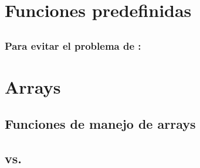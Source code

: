 \documentclass[a4paper,11pt,spanish]{sphinxmanual}
\begin{document}
\section{Funciones predefinidas}
\label{\detokenize{php:funciones-predefinidas}}

\subsection{}
\label{\detokenize{php:isset}}

\subsection{}
\label{\detokenize{php:empty}}

\subsubsection{Para evitar el problema de :}
\label{\detokenize{php:para-evitar-el-problema-de-empty-0-true}}
\begin{sphinxVerbatim}[commandchars=\\\{\}]
 
       
\end{sphinxVerbatim}


\section{Arrays}
\label{\detokenize{php:arrays}}

\subsection{Funciones de manejo de arrays}
\label{\detokenize{php:funciones-de-manejo-de-arrays}}

\subsection{}
\label{\detokenize{php:foreach}}

\subsection{ vs. }
\label{\detokenize{php:isset-vs-array-key-exists}}
\end{document}
